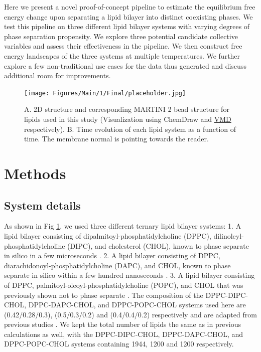 \documentclass{biophys-new}
\begin{document}
Here we present a novel proof-of-concept pipeline to estimate the equilibrium free energy change upon separating a lipid bilayer into distinct coexisting phases.
We test this pipeline on three different lipid bilayer systems with varying degrees of phase separation propensity.
We explore three potential candidate collective variables and assess their effectiveness in the pipeline.
We then construct free energy landscapes of the three systems at multiple temperatures.
We further explore a few non-traditional use cases for the data thus generated and discuss additional room for improvements.

\begin{figure}[hbt!]
\centering
\texttt{[image: Figures/Main/1/Final/placeholder.jpg]}
\caption{A. 2D structure and corresponding MARTINI 2 bead structure for lipids used in this study (Visualization using ChemDraw and \href{http://www.ks.uiuc.edu/Research/vmd/}{VMD}\cite{Humphrey1996,STON1998} respectively). B. Time evolution of each lipid system as a function of time. The membrane normal is pointing towards the reader.}
\label{fig1:view}
\end{figure}

\section*{Methods}

\subsection*{System details}

As shown in Fig \ref{fig1:view}, we used three different ternary lipid bilayer systems:
1. A lipid bilayer consisting of dipalmitoyl-phosphatidylcholine (DPPC), dilinoleyl-phosphatidylcholine (DIPC), and cholesterol (CHOL), known to phase separate in silico in a few microseconds \cite{Risselada2008, Schafer2010, Janosi2012, Doma2012, Jong2013, Liu2020, Su2020}.
2. A lipid bilayer consisting of DPPC, diarachidonoyl-phosphatidylcholine (DAPC), and CHOL, known to phase separate in silico within a few hundred nanoseconds \cite{Lin2016, Lin2019, Davis2013a}.
3. A lipid bilayer consisting of DPPC, palmitoyl-oleoyl-phosphatidylcholine (POPC), and CHOL that was previously shown not to phase separate \cite{Veatch2003,Davis2013a}.
The composition of the DPPC-DIPC-CHOL, DPPC-DAPC-CHOL, and DPPC-POPC-CHOL systems used here are (0.42/0.28/0.3), (0.5/0.3/0.2) and (0.4/0.4/0.2) respectively and are adapted from previous studies \cite{Risselada2008, Lin2016, Davis2013a}.
We kept the total number of lipids the same as in previous calculations as well, with the  DPPC-DIPC-CHOL, DPPC-DAPC-CHOL, and DPPC-POPC-CHOL systems containing 1944, 1200 and 1200 respectively. 
\end{document}
